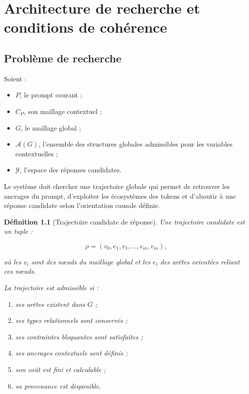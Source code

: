 \documentclass[11pt,a4paper,oneside]{book}
\newtheorem{definition}{Définition}[chapter]
\theoremstyle{remark}
\begin{document}
\chapter{Architecture de recherche et conditions de cohérence}

\section{Problème de recherche}

Soient :

\begin{itemize}
  \item \(P\), le prompt courant ;
  \item \(C_P\), son maillage contextuel ;
  \item \(G\), le maillage global ;
  \item \(\mathcal{A}(G)\), l'ensemble des structures globales
        admissibles pour les variables contextuelles ;
  \item \(\mathcal{Y}\), l'espace des réponses candidates.
\end{itemize}

Le système doit chercher une trajectoire globale qui permet de
retrouver les ancrages du prompt, d'exploiter les écosystèmes des
tokens et d'aboutir à une réponse candidate selon l'orientation
causale définie.

\begin{definition}[Trajectoire candidate de réponse]
Une trajectoire candidate est un tuple :

\[
\rho=(v_0,e_1,v_1,\ldots,e_m,v_m),
\]

où les \(v_i\) sont des nœuds du maillage global et les \(e_i\)
des arêtes orientées reliant ces nœuds.

La trajectoire est admissible si :
\begin{enumerate}
  \item ses arêtes existent dans \(G\) ;
  \item ses types relationnels sont conservés ;
  \item ses contraintes bloquantes sont satisfaites ;
  \item ses ancrages contextuels sont définis ;
  \item son coût est fini et calculable ;
  \item sa provenance est disponible.
\end{enumerate}
\end{definition}
\end{document}
